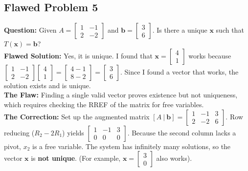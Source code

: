 \documentclass[11pt]{article}
\begin{document}
\subsection{Flawed Problem 5}
\textbf{Question:} Given $A = \begin{bmatrix} 1 & -1 \\ 2 & -2 \end{bmatrix}$ and $\mathbf{b} = \begin{bmatrix} 3 \\ 6 \end{bmatrix}$. Is there a unique $\mathbf{x}$ such that $T(\mathbf{x}) = \mathbf{b}$? \\
\textbf{Flawed Solution:} Yes, it is unique. I found that $\mathbf{x} = \begin{bmatrix} 4 \\ 1 \end{bmatrix}$ works because $\begin{bmatrix} 1 & -1 \\ 2 & -2 \end{bmatrix} \begin{bmatrix} 4 \\ 1 \end{bmatrix} = \begin{bmatrix} 4-1 \\ 8-2 \end{bmatrix} = \begin{bmatrix} 3 \\ 6 \end{bmatrix}$. Since I found a vector that works, the solution exists and is unique. \\
\textbf{The Flaw:} Finding a single valid vector proves existence but not uniqueness, which requires checking the RREF of the matrix for free variables. \\
\textbf{The Correction:} Set up the augmented matrix $[A \ | \ \mathbf{b}] = \left[ \begin{array}{cc|c} 1 & -1 & 3 \\ 2 & -2 & 6 \end{array} \right]$. Row reducing ($R_2 - 2R_1$) yields $\left[ \begin{array}{cc|c} 1 & -1 & 3 \\ 0 & 0 & 0 \end{array} \right]$. Because the second column lacks a pivot, $x_2$ is a free variable. The system has infinitely many solutions, so the vector $\mathbf{x}$ is \textbf{not unique}. (For example, $\mathbf{x} = \begin{bmatrix} 3 \\ 0 \end{bmatrix}$ also works).
\end{document}
